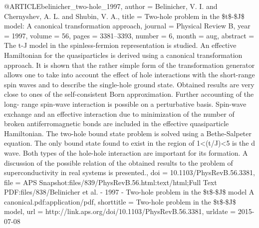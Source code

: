 @ARTICLE{belinicher_two-hole_1997,
  author = {Belinicher, V. I. and Chernyshev, A. L. and Shubin, V. A.},
  title = {Two-hole problem in the \$t\$-\${J}\$ model: {A} canonical transformation
	approach},
  journal = {Physical Review B},
  year = {1997},
  volume = {56},
  pages = {3381--3393},
  number = {6},
  month = aug,
  abstract = {The t-J model in the spinless-fermion representation is studied. An
	effective Hamiltonian for the quasiparticles is derived using a canonical
	transformation approach. It is shown that the rather simple form
	of the transformation generator allows one to take into account the
	effect of hole interactions with the short-range spin waves and to
	describe the single-hole ground state. Obtained results are very
	close to ones of the self-consistent Born approximation. Further
	accounting of the long- range spin-wave interaction is possible on
	a perturbative basis. Spin-wave exchange and an effective interaction
	due to minimization of the number of broken antiferromagnetic bonds
	are included in the effective quasiparticle Hamiltonian. The two-hole
	bound state problem is solved using a Bethe-Salpeter equation. The
	only bound state found to exist in the region of 1{\textless}(t/J){\textless}5
	is the d wave. Both types of the hole-hole interaction are important
	for its formation. A discussion of the possible relation of the obtained
	results to the problem of superconductivity in real systems is presented.},
  doi = {10.1103/PhysRevB.56.3381},
  file = {APS Snapshot:files/839/PhysRevB.56.html:text/html;Full Text PDF:files/838/Belinicher et al. - 1997 - Two-hole problem in the \$t\$-\$J\$ model A canonical.pdf:application/pdf},
  shorttitle = {Two-hole problem in the \$t\$-\${J}\$ model},
  url = {http://link.aps.org/doi/10.1103/PhysRevB.56.3381},
  urldate = {2015-07-08}
}

